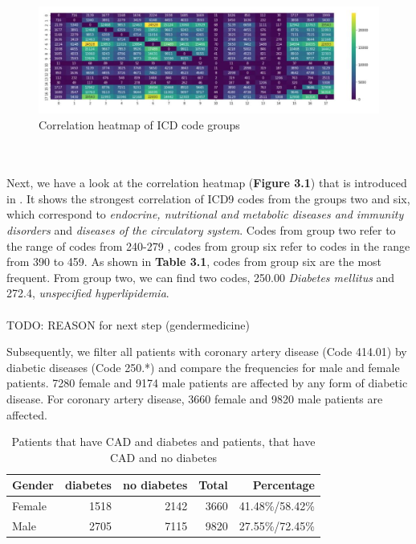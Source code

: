 \documentclass[11pt, a4paper]{book}
\begin{document}
\begin{figure}
  \begin{center}
  \includegraphics[width=1\textwidth]{img/correlation-heatmap.png}
  \caption{Correlation heatmap of ICD code groups \cite{arya2019exploratory}}
  \label{fig:correlation-heatmap}
  \end{center}
\end{figure}


\\
\\
Next, we have a look at the correlation heatmap (\textbf{Figure 3.1}) that is introduced in \cite{arya2019exploratory}. It shows the strongest correlation of ICD9 codes from the groups two and six, which correspond to \textit{endocrine, nutritional and metabolic diseases and immunity disorders} and \textit{diseases of the circulatory system}. Codes from group two refer to the range of codes from 240-279 , codes from group six refer to codes in the range from 390 to 459. As shown in \textbf{Table 3.1}, codes from group six are the most frequent. From group two, we can find two codes, 250.00 \textit{Diabetes mellitus} and 272.4, \textit{unspecified hyperlipidemia}.
\\
\\
TODO: REASON for next step (gendermedicine)

Subsequently, we filter all patients with coronary artery disease (Code 414.01) by diabetic diseases (Code 250.*) and compare the frequencies for male and female patients. 7280 female and 9174 male patients are affected by any form of diabetic disease.
For coronary artery disease, 3660 female and 9820 male patients are affected. 


\begin{table}
\begin{center}
\begin{tabularx}{\textwidth}{X|r|r|r|r}
Gender & diabetes & no diabetes & Total & Percentage\\
\hline
Female & 1518 & 2142 & 3660 & 41.48\%/58.42\%\\
Male 	& 2705 & 7115 & 9820 & 27.55\%/72.45\%\\
\end{tabularx}
\caption{\label{tab:cad-diabetic}Patients that have CAD and diabetes and patients, that have CAD and no diabetes}
\end{center}
\end{table}
\end{document}
